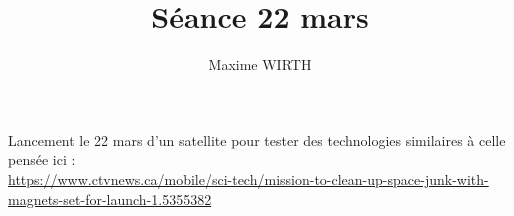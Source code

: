 \documentclass{article}
\author{Maxime WIRTH}
\title{Séance 22 mars}
\begin{document}
\maketitle

Lancement le 22 mars d'un satellite pour tester des technologies similaires à celle pensée ici :\\
\url{https://www.ctvnews.ca/mobile/sci-tech/mission-to-clean-up-space-junk-with-magnets-set-for-launch-1.5355382}
\end{document}
